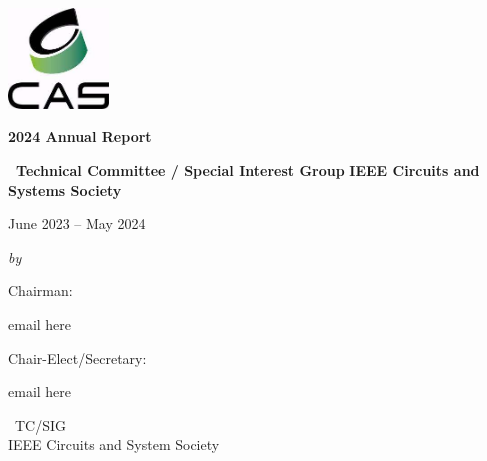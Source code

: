 \documentclass{article}
\begin{document}

\begin{center}
\vspace*{3\baselineskip}

\includegraphics[width=0.2\textwidth]{figs/cass_logo.jpeg}\\
\vfill

{\huge \textbf{2024 Annual Report}}

\vspace*{3\baselineskip}

{\LARGE \textbf{\TCNAME \ Technical Committee / Special Interest Group}}
{\LARGE \textbf{IEEE Circuits and Systems Society}}

\begin{large}
\vspace*{2\baselineskip}

June 2023 – May 2024

\vspace*{2\baselineskip}

\emph{by} \\[1ex]
{\Large Chairman: \CHAIRNAME \\ \par} %
{{ email here}}\\[0.5cm] %
{\Large Chair-Elect/Secretary: \CHAIRELECTNAME \\ \par} %
{{ email here}}\\[2cm] %

\vspace*{4\baselineskip}

{\TCFULLNAME \ TC/SIG}\\
{\large IEEE Circuits and System Society}\par %

\thispagestyle{empty} 

\end{large}
\end{center}
\pagebreak
\end{document}
